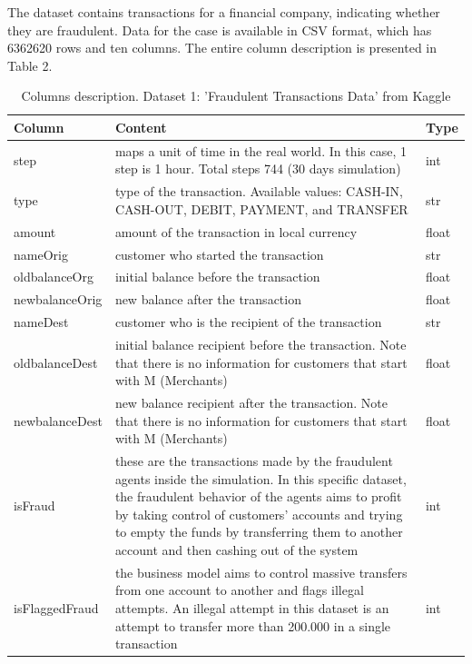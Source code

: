 \documentclass[12pt,a4paper, hidelinks]{article}
\begin{document}
The dataset contains transactions for a financial company, indicating whether they are fraudulent. Data for the case is available in CSV format, which has 6362620 rows and ten columns. The entire column description is presented in Table 2.

\begin{table}[ht!]
\centering
\begin{tabular}{|p{3cm}|p{9.8cm}|p{2cm}|}
\hline
\textbf{Column} & \textbf{Content} & \textbf{Type} \\
\hline
step & maps a unit of time in the real world. In this case, 1 step is 1 hour. Total steps 744 (30 days simulation) & int \\
\hline
type & type of the transaction. Available values: CASH-IN, CASH-OUT, DEBIT, PAYMENT, and TRANSFER & str \\
\hline
amount & amount of the transaction in local currency & float \\
\hline
nameOrig & customer who started the transaction & str \\
\hline
oldbalanceOrg & initial balance before the transaction & float \\
\hline
newbalanceOrig & new balance after the transaction & float \\
\hline
nameDest & customer who is the recipient of the transaction & str \\
\hline
oldbalanceDest & initial balance recipient before the transaction. Note that there is no information for customers that start with M (Merchants) & float \\
\hline
newbalanceDest & new balance recipient after the transaction. Note that there is no information for customers that start with M (Merchants) & float \\
\hline
isFraud & these are the transactions made by the fraudulent agents inside the simulation. In this specific dataset, the fraudulent behavior of the agents aims to profit by taking control of customers' accounts and trying to empty the funds by transferring them to another account and then cashing out of the system & int \\
\hline
isFlaggedFraud & the business model aims to control massive transfers from one account to another and flags illegal attempts. An illegal attempt in this dataset is an attempt to transfer more than 200.000 in a single transaction & int \\
\hline
\end{tabular}
\caption{Columns description. Dataset 1: 'Fraudulent Transactions Data' from Kaggle}
\end{table}
\end{document}
